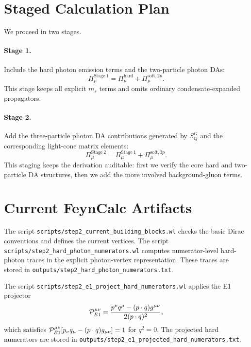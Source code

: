\documentclass[11pt]{article}
\begin{document}
\section{Staged Calculation Plan}

We proceed in two stages.

\paragraph{Stage 1.}
Include the hard photon emission terms and the two-particle photon DAs:
\begin{equation}
  \Pi_\mu^{\mathrm{Stage\ 1}}
  =
  \Pi_\mu^{\mathrm{hard}}
  +
  \Pi_\mu^{\mathrm{soft},2p}.
\end{equation}
This stage keeps all explicit $m_s$ terms and omits ordinary
condensate-expanded propagators.

\paragraph{Stage 2.}
Add the three-particle photon DA contributions generated by
$S_Q^G$ and the corresponding light-cone matrix elements:
\begin{equation}
  \Pi_\mu^{\mathrm{Stage\ 2}}
  =
  \Pi_\mu^{\mathrm{Stage\ 1}}
  +
  \Pi_\mu^{\mathrm{soft},3p}.
\end{equation}
This staging keeps the derivation auditable: first we verify the core hard and
two-particle DA structures, then we add the more involved background-gluon
terms.

\section{Current FeynCalc Artifacts}

The script \texttt{scripts/step2\_current\_building\_blocks.wl} checks the
basic Dirac conventions and defines the current vertices.  The script
\texttt{scripts/step2\_hard\_photon\_numerators.wl} computes numerator-level
hard-photon traces in the explicit photon-vertex representation.  These traces
are stored in \texttt{outputs/step2\_hard\_photon\_numerators.txt}.

The script \texttt{scripts/step2\_e1\_project\_hard\_numerators.wl} applies the
E1 projector
\begin{equation}
  {\cal P}^{\mu\nu}_{E1}
  =
  \frac{p^\nu q^\mu-(p\cdot q)g^{\mu\nu}}{2(p\cdot q)^2},
\end{equation}
which satisfies ${\cal P}_{E1}^{\mu\nu}
[p_\nu q_\mu-(p\cdot q)g_{\mu\nu}]=1$ for $q^2=0$.  The projected hard
numerators are stored in
\texttt{outputs/step2\_e1\_projected\_hard\_numerators.txt}.
\end{document}

